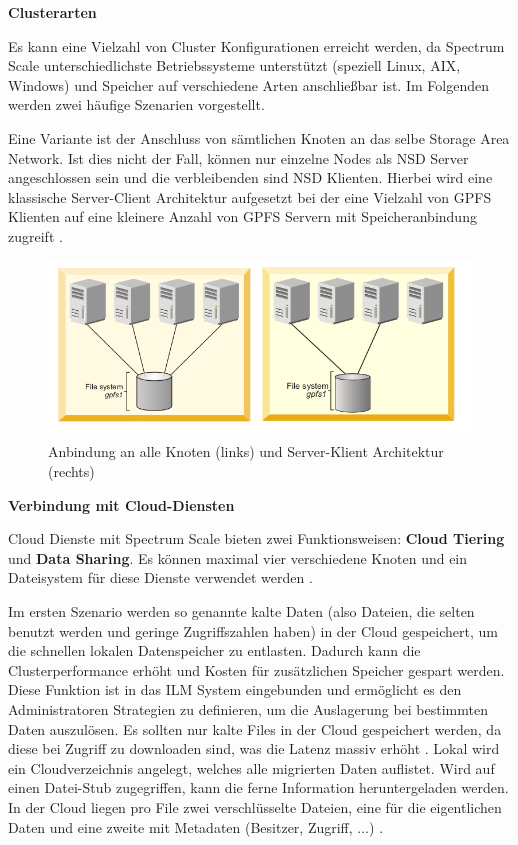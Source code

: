 \textbf{Clusterarten}

Es kann eine Vielzahl von Cluster Konfigurationen erreicht werden, da Spectrum Scale unterschiedlichste Betriebssysteme unterstützt (speziell Linux, AIX, Windows) und Speicher auf verschiedene Arten anschließbar ist. Im Folgenden werden zwei häufige Szenarien vorgestellt.

Eine Variante ist der Anschluss von sämtlichen Knoten an das selbe Storage Area Network. Ist dies nicht der Fall, können nur einzelne Nodes als \ac{NSD} Server angeschlossen sein und die verbleibenden sind \ac{NSD} Klienten. Hierbei wird eine klassische Server-Client Architektur aufgesetzt bei der eine Vielzahl von GPFS Klienten auf eine kleinere Anzahl von GPFS Servern mit Speicheranbindung zugreift \parencite[S. 8]{ibm.2017}.

\begin{figure}[hbt]
	\centering
	\includegraphics[scale=0.6]{images/gpfs-architectures}
	\caption{Anbindung an alle Knoten (links) und Server-Klient Architektur (rechts) \parencite[S. 8]{ibm.2017}}
	\label{fig:gpfsarchitecture}
\end{figure}

\textbf{Verbindung mit Cloud-Diensten}

Cloud Dienste mit Spectrum Scale bieten zwei Funktionsweisen: \textbf{Cloud Tiering} und \textbf{Data Sharing}. Es können maximal vier verschiedene Knoten und ein Dateisystem für diese Dienste verwendet werden \parencite{mani.2017}.

Im ersten Szenario werden so genannte kalte Daten (also Dateien, die selten benutzt werden und geringe Zugriffszahlen haben) in der Cloud gespeichert, um die schnellen lokalen Datenspeicher zu entlasten. Dadurch kann die Clusterperformance erhöht und Kosten für zusätzlichen Speicher gespart werden. Diese Funktion ist in das \ac{ILM} System eingebunden und ermöglicht es den Administratoren Strategien zu definieren, um die Auslagerung bei bestimmten Daten auszulösen.
Es sollten nur kalte Files in der Cloud gespeichert werden, da diese bei Zugriff zu downloaden sind, was die Latenz massiv erhöht \parencite[S. 107]{ibm.2017}.
Lokal wird ein Cloudverzeichnis angelegt, welches alle migrierten Daten auflistet. Wird auf einen Datei-Stub zugegriffen, kann die ferne Information heruntergeladen werden. In der Cloud liegen pro File zwei verschlüsselte Dateien, eine für die eigentlichen Daten und eine zweite mit Metadaten (Besitzer, Zugriff, ...) \parencite[S. 108]{ibm.2017}.

